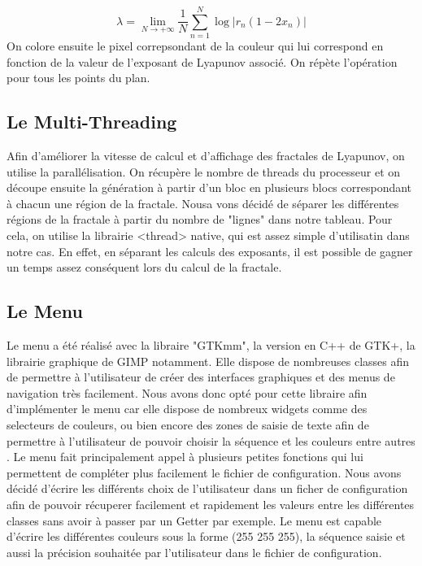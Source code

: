 \documentclass{article}
\begin{document}
$$
\lambda = \lim_{N \to +\infty} \frac{1}{N} \sum_{n=1}^{N} \log | r_n(1-2x_n) |
$$
On colore ensuite le pixel correpsondant de la couleur qui lui correspond en fonction de la valeur de l'exposant de Lyapunov associé.
On répète l'opération pour tous les points du plan.

\subsection*{Le Multi-Threading}
Afin d'améliorer la vitesse de calcul et d'affichage des fractales de Lyapunov, on utilise la parallélisation. On récupère le nombre de threads du processeur et on découpe ensuite la génération à partir d'un bloc en plusieurs blocs correspondant à chacun une région de la fractale.
Nousa vons décidé de séparer les différentes régions de la fractale à partir du nombre de "lignes" dans notre tableau.
 Pour cela, on utilise la librairie <thread> native, qui est assez simple d'utilisatin dans notre cas.
En effet, en séparant les calculs des exposants, il est possible de gagner un temps assez conséquent lors du calcul de la fractale.

\subsection*{Le Menu}
Le menu a été réalisé avec la libraire "GTKmm", la version en C++ de GTK+, la librairie graphique de GIMP notamment. Elle dispose de nombreuses classes afin de permettre à l'utilisateur de créer des interfaces graphiques et des menus de navigation très facilement. Nous avons donc opté pour cette libraire afin d'implémenter le menu car elle dispose de nombreux widgets comme des selecteurs de couleurs, ou bien encore des zones de saisie de texte afin de permettre à l'utilisateur de pouvoir choisir la séquence et les couleurs entre autres . Le menu fait principalement appel à plusieurs petites fonctions qui lui permettent de compléter plus facilement le fichier de configuration. Nous avons décidé d'écrire les différents choix de l'utilisateur dans un ficher de configuration afin de pouvoir récuperer facilement et rapidement les valeurs entre les différentes classes sans avoir à passer par un Getter par exemple. Le menu est capable d'écrire les différentes couleurs sous la forme (255 255 255), la séquence saisie et aussi la précision souhaitée par l'utilisateur dans le fichier de configuration. 
\end{document}
